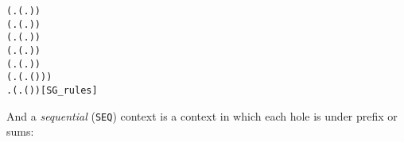 \begin{alltt}
\HOLTokenTurnstile{} (\HOLSymConst{\HOLTokenForall{}}.  (\HOLTokenLambda{}. )) \HOLSymConst{\HOLTokenConj{}}
   (\HOLSymConst{\HOLTokenForall{}} .   \HOLSymConst{\HOLTokenImp{}}  (\HOLTokenLambda{}.   )) \HOLSymConst{\HOLTokenConj{}}
   (\HOLSymConst{\HOLTokenForall{}} .   \HOLSymConst{\HOLTokenImp{}}  (\HOLTokenLambda{}.  )) \HOLSymConst{\HOLTokenConj{}}
   (\HOLSymConst{\HOLTokenForall{}} .   \HOLSymConst{\HOLTokenConj{}}   \HOLSymConst{\HOLTokenImp{}}  (\HOLTokenLambda{}.   \HOLSymConst{+}  )) \HOLSymConst{\HOLTokenConj{}}
   (\HOLSymConst{\HOLTokenForall{}} .   \HOLSymConst{\HOLTokenConj{}}   \HOLSymConst{\HOLTokenImp{}}  (\HOLTokenLambda{}.   \HOLSymConst{\ensuremath{\parallel}}  )) \HOLSymConst{\HOLTokenConj{}}
   (\HOLSymConst{\HOLTokenForall{}} .   \HOLSymConst{\HOLTokenImp{}}  (\HOLTokenLambda{}. \HOLSymConst{\ensuremath{\nu}}  ( ))) \HOLSymConst{\HOLTokenConj{}}
   \HOLSymConst{\HOLTokenForall{}} .   \HOLSymConst{\HOLTokenImp{}}  (\HOLTokenLambda{}.  ( ) )\hfill{[SG_rules]}
\end{alltt}
And a \emph{sequential} (\texttt{SEQ}) context is a context in which each hole is under prefix or sums:
